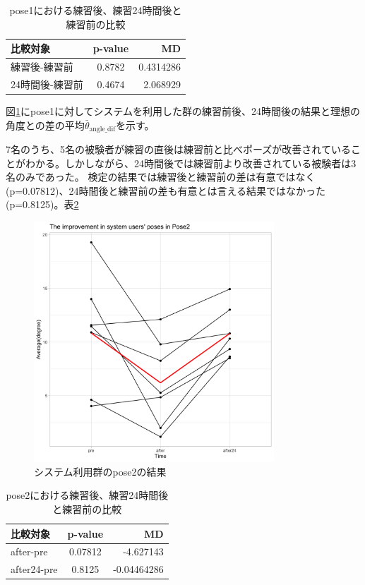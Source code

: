       \begin{table}[h]
        \centering
        \caption{pose1における練習後、練習24時間後と練習前の比較}
        \begin{tabular}{lcr}
        \hline
        \textbf{比較対象} & \textbf{p-value} & \textbf{MD} \\ \hline
        練習後-練習前 & 0.8782 & 0.4314286 \\ \hline
        24時間後-練習前 & 0.4674 & 2.068929 \\ \hline
        \end{tabular}
        \label{table:pose1_system_p_value}
        \end{table}

        図\ref{fig:pose2_system}にpose1に対してシステムを利用した群の練習前後、24時間後の結果と理想の角度との差の平均\(\bar{\theta}_{\text{angle\_dif}}\)を示す。


      7名のうち、5名の被験者が練習の直後は練習前と比べポーズが改善されていることがわかる。しかしながら、24時間後では練習前より改善されている被験者は3名のみであった。
      検定の結果では練習後と練習前の差は有意ではなく(p=0.07812)、24時間後と練習前の差も有意とは言える結果ではなかった(p=0.8125)。表\ref{table:pose2_system_p_value}
      \begin{figure}[H]
        \begin{center}
        \includegraphics[width=9cm]{figures/pose2_system_true_graph.png}
        \caption{システム利用群のpose2の結果}
        \label{fig:pose2_system}
        \end{center}
      \end{figure}

      \begin{table}[h]
        \centering
        \caption{pose2における練習後、練習24時間後と練習前の比較}
        \begin{tabular}{lcr}
        \hline
        \textbf{比較対象} & \textbf{p-value} & \textbf{MD} \\ \hline
        after-pre & 0.07812 & -4.627143 \\ \hline
        after24-pre & 0.8125 & -0.04464286 \\ \hline
        \end{tabular}
        \label{table:pose2_system_p_value}
        \end{table}
